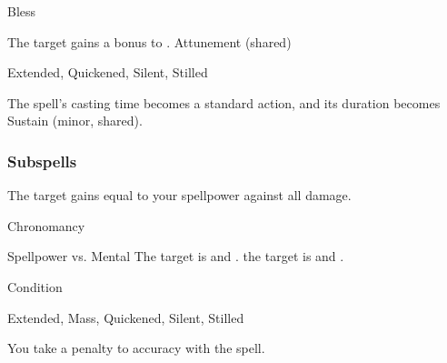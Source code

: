 \begin{spellsection}{Bless}
\begin{spellheader}
\end{spellheader}
\begin{spellcontent}
\begin{spelltargetinginfo}
\end{spelltargetinginfo}
\begin{spelleffects}
\spelleffect The target gains a  bonus to .
\spelldur Attunement (shared)
\end{spelleffects}
\end{spellcontent}
\begin{spellfooter}
 Extended, Quickened, Silent, Stilled
\end{spellfooter}
\begin{spellsubcontent}
\begin{spellcantrip}
The spell's casting time becomes a standard action, and its duration becomes Sustain (minor, shared).
\end{spellcantrip}
\end{spellsubcontent}
\end{spellsection}
\subsubsection{Subspells}
The target gains  equal to your spellpower against all damage.
\begin{spellsection}{Chronomancy}
\begin{spellheader}
\end{spellheader}
\begin{spellcontent}
\begin{spelltargetinginfo}
\end{spelltargetinginfo}
\begin{spelleffects}
\begin{spellattack}{Spellpower vs. Mental}
\spellsuccess
The target is  and .
\spellcritical
the target is  and .
\end{spellattack}
\spelldur Condition
\end{spelleffects}
\end{spellcontent}
\begin{spellfooter}
 Extended, Mass, Quickened, Silent, Stilled
\end{spellfooter}
\begin{spellsubcontent}
\begin{spellcantrip}
You take a  penalty to accuracy with the spell.
\end{spellcantrip}
\end{spellsubcontent}
\end{spellsection}
